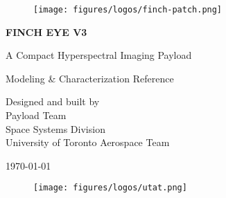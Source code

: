\begin{titlepage}
    \begin{center}
        \vspace*{1cm}

        \begin{figure}[H]
            \centering
            \texttt{[image: figures/logos/finch-patch.png]}
        \end{figure}

        {\Huge\textbf{FINCH EYE V3}}

        \bigskip
        \bigskip

        {\LARGE A Compact Hyperspectral Imaging Payload}

        \bigskip
        \bigskip
        \bigskip

        {\Large Modeling \& Characterization Reference \\}

        \vfill

        {\normalsize Designed and built by \\
            Payload Team \\
            Space Systems Division \\
            University of Toronto Aerospace Team \\}

        \bigskip
        \bigskip
        \bigskip

        {\Large \today}

        \begin{figure}[H]
            \centering
            \texttt{[image: figures/logos/utat.png]}
            \label{fig:logo}
        \end{figure}

    \end{center}
\end{titlepage}

